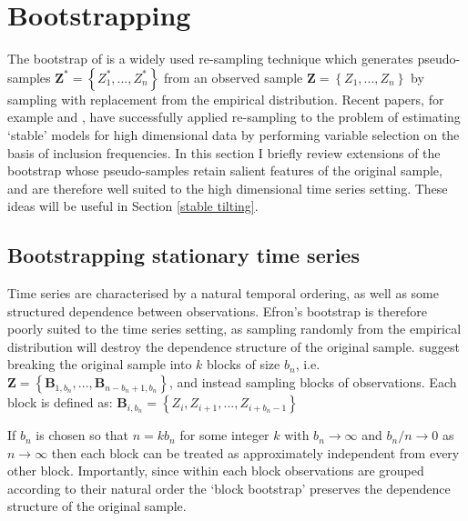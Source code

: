 \documentclass[11pt]{report}\usepackage[utf8]{inputenc}
\begin{document}
\section{Bootstrapping}

The bootstrap of \cite{efron1992bootstrap} is a widely used re-sampling technique which generates pseudo-samples $\boldsymbol{Z}^* = \left \{ Z_{1}^*,...,Z_{n}^* \right \}$ from an observed sample $\boldsymbol{Z} = \left \{ Z_{1},...,Z_{n} \right \}$ by sampling with replacement from the empirical distribution. Recent papers, for example \cite{meinshausen2010stability} and \cite{christinelse}, have successfully applied re-sampling to the problem of estimating `stable' models for high dimensional data by performing variable selection on the basis of inclusion frequencies. In this section I briefly review extensions of the bootstrap whose pseudo-samples retain salient features of the original sample, and are therefore well suited to the high dimensional time series setting. These ideas will be useful in Section \ref{stable tilting}. 

\subsection{Bootstrapping stationary time series} \label{Bootstrapping ts}

Time series are characterised by a natural temporal ordering, as well as some structured dependence between observations. Efron's bootstrap is therefore poorly suited to the time series setting, as sampling randomly from the empirical distribution will destroy the dependence structure of the original sample. \cite{kunsch1989jackknife} suggest breaking the original sample into $k$ blocks of size $b_n$, i.e. $\boldsymbol{Z} = \left \{ \boldsymbol{B}_{1,b_n},...,\boldsymbol{B}_{n-b_n+1,b_n} \right \}$, and instead sampling blocks of observations. Each block is defined as:  $\boldsymbol{B}_{i,b_n} = \left \{ Z_i, Z_{i+1},...,Z_{i+b_n-1} \right \}$

If $b_n$ is chosen so that $ n = k b_n$ for some integer $k$ with $b_n \rightarrow \infty$ and $b_n/n \rightarrow 0$ as $n \rightarrow \infty$ then each block can be treated as approximately independent from every other block. Importantly, since within each block observations are grouped according to their natural order the `block bootstrap' preserves the dependence structure of the original sample. 
\end{document}
